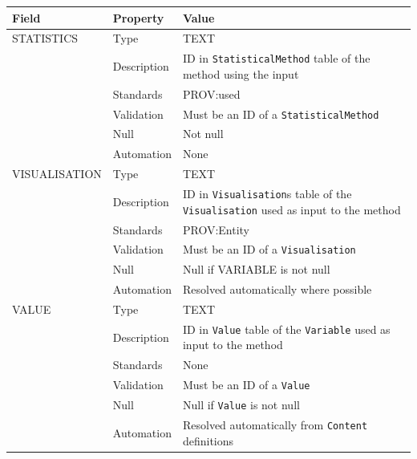 \documentclass[
]{article}
\newcounter{none} %
\begin{document}
{\def\LTcaptype{none} %
\begin{longtable}[]{@{}
  >{\raggedright\arraybackslash}p{}
  >{\raggedright\arraybackslash}p{}
  >{\raggedright\arraybackslash}p{}@{}}
\toprule\noalign{}
\begin{minipage}[b]{\linewidth}\raggedright
Field
\end{minipage} & \begin{minipage}[b]{\linewidth}\raggedright
Property
\end{minipage} & \begin{minipage}[b]{\linewidth}\raggedright
Value
\end{minipage} \\
\midrule\noalign{}
\endhead
\bottomrule\noalign{}
\endlastfoot
STATISTICS & Type & TEXT \\
& Description & ID in \texttt{StatisticalMethod} table of the method
using the input \\
& Standards & PROV:used \\
& Validation & Must be an ID of a \texttt{StatisticalMethod} \\
& Null & Not null \\
& Automation & None \\
VISUALISATION & Type & TEXT \\
& Description & ID in \texttt{Visualisation}s table of the
\texttt{Visualisation} used as input to the method \\
& Standards & PROV:Entity \\
& Validation & Must be an ID of a \texttt{Visualisation} \\
& Null & Null if VARIABLE is not null \\
& Automation & Resolved automatically where possible \\
VALUE & Type & TEXT \\
& Description & ID in \texttt{Value} table of the \texttt{Variable} used
as input to the method \\
& Standards & None \\
& Validation & Must be an ID of a \texttt{Value} \\
& Null & Null if \texttt{Value} is not null \\
& Automation & Resolved automatically from \texttt{Content}
definitions \\
\end{longtable}
}
\end{document}
